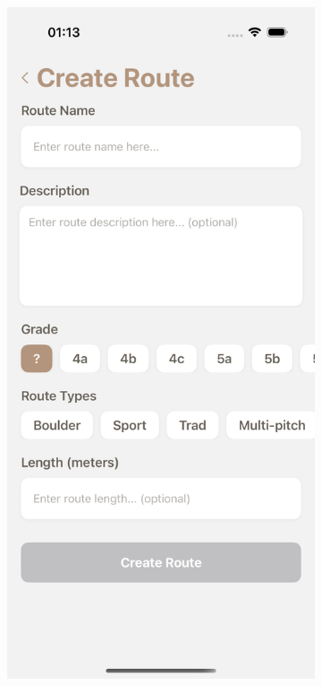 \begin{figure}[H]
\begin{subfigure}[b]{0.38\textwidth}
        \includegraphics[width=\textwidth]{images/implementacija/editing-options/create-route.png}

\end{subfigure}
\end{figure}
